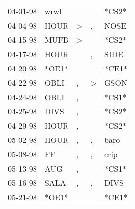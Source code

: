 \begin{supertabular}{p{0.07\textwidth}p{0.06\textwidth}p{0.02\textwidth}p{0.02\textwidth}p{0.06\textwidth}}
          04-01-98\textsuperscript{} &           wrwl\textsuperscript{} &                  &                  &                            *CS2* \\
          04-04-98\textsuperscript{} &           HOUR\textsuperscript{} &     \textgreater &                , &           NOSE\textsuperscript{} \\
          04-15-98\textsuperscript{} &           MUFB\textsuperscript{} &     \textgreater &                  &                            *CS2* \\
          04-17-98\textsuperscript{} &           HOUR\textsuperscript{} &                  &                , &           SIDE\textsuperscript{} \\
          04-20-98\textsuperscript{} &                            *OE1* &                  &                  &                            *CE1* \\
          04-22-98\textsuperscript{} &           OBLI\textsuperscript{} &                , &     \textgreater &           GSON\textsuperscript{} \\
          04-24-98\textsuperscript{} &           OBLI\textsuperscript{} &                , &                  &                            *CS1* \\
          04-25-98\textsuperscript{} &           DIVS\textsuperscript{} &                , &                  &                            *CS2* \\
          04-29-98\textsuperscript{} &           HOUR\textsuperscript{} &                , &                  &                            *CS2* \\
          05-02-98\textsuperscript{} &           HOUR\textsuperscript{} &                , &                , &           baro\textsuperscript{} \\
          05-08-98\textsuperscript{} &             FF\textsuperscript{} &                , &                , &           crip\textsuperscript{} \\
          05-13-98\textsuperscript{} &            AUG\textsuperscript{} &                , &                  &                            *CS1* \\
          05-16-98\textsuperscript{} &           SALA\textsuperscript{} &                , &                , &           DIVS\textsuperscript{} \\
          05-21-98\textsuperscript{} &                            *OE1* &                  &                  &                            *CE1* \\

\end{supertabular}
